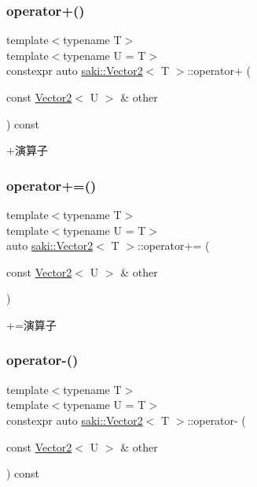 \subsubsection{\texorpdfstring{operator+()}{operator+()}}
{\footnotesize\ttfamily template$<$typename T$>$ \\
template$<$typename U  = T$>$ \\
constexpr auto \mbox{\hyperlink{classsaki_1_1_vector2}{saki\+::\+Vector2}}$<$ T $>$\+::operator+ (\begin{DoxyParamCaption}\item[{const \mbox{\hyperlink{classsaki_1_1_vector2}{Vector2}}$<$ U $>$ \&}]{other }\end{DoxyParamCaption}) const\hspace{0.3cm}{\ttfamily [inline]}}



+演算子 

\mbox{\label{classsaki_1_1_vector2_aa76ccb2d2228441d510dca7781f785d3}} 
\subsubsection{\texorpdfstring{operator+=()}{operator+=()}}
{\footnotesize\ttfamily template$<$typename T$>$ \\
template$<$typename U  = T$>$ \\
auto \mbox{\hyperlink{classsaki_1_1_vector2}{saki\+::\+Vector2}}$<$ T $>$\+::operator+= (\begin{DoxyParamCaption}\item[{const \mbox{\hyperlink{classsaki_1_1_vector2}{Vector2}}$<$ U $>$ \&}]{other }\end{DoxyParamCaption})\hspace{0.3cm}{\ttfamily [inline]}}



+=演算子 

\mbox{\label{classsaki_1_1_vector2_a4be4c970957e552bdd98fa37ef4f14df}} 
\subsubsection{\texorpdfstring{operator-\/()}{operator-()}}
{\footnotesize\ttfamily template$<$typename T$>$ \\
template$<$typename U  = T$>$ \\
constexpr auto \mbox{\hyperlink{classsaki_1_1_vector2}{saki\+::\+Vector2}}$<$ T $>$\+::operator-\/ (\begin{DoxyParamCaption}\item[{const \mbox{\hyperlink{classsaki_1_1_vector2}{Vector2}}$<$ U $>$ \&}]{other }\end{DoxyParamCaption}) const\hspace{0.3cm}{\ttfamily [inline]}}



